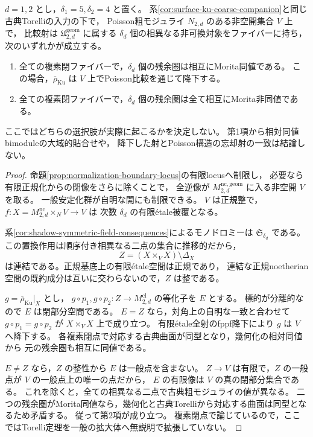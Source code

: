 \begin{proposition}[全同値または全て相互に非同値]
\label{prop:surface-ku-generic-dichotomy}
$d=1,2$ とし，$\delta_1=5,\delta_2=4$ と置く。
系\ref{cor:surface-ku-coarse-companion}と同じ古典Torelliの入力の下で，
Poisson粗モジュライ $N_{2,d}$ のある非空開集合 $V$ 上で，
比較射は $\mathfrak U^{\mathrm{geom}}_{2,d}$ に属する
$\delta_d$ 個の相異なる非可換対象をファイバーに持ち，次のいずれかが成立する。
\begin{enumerate}
 \item 全ての複素閉ファイバーで，$\delta_d$ 個の残余圏は相互にMorita同値である。
       この場合，$\overline\rho_{\mathrm{Ku}}$ は $V$ 上でPoisson比較を通じて降下する。
 \item 全ての複素閉ファイバーで，$\delta_d$ 個の残余圏は全て相互にMorita非同値である。
\end{enumerate}
ここではどちらの選択肢が実際に起こるかを決定しない。
第1項から相対同値bimoduleの大域的貼合せや，
降下した射とPoisson構造の忘却射の一致は結論しない。
\end{proposition}
\begin{proof}
命題\ref{prop:normalization-boundary-locus}の有限locusへ制限し，
必要なら有限正規化からの閉像をさらに除くことで，
全逆像が $M^{\mathrm{nc,geom}}_{2,d}$ に入る非空開 $V$ を取る。
一般安定化群が自明な開にも制限できる。
$V$ は正規整で，$f:X=M^{\mathrm{nc}}_{2,d}\times_N V\to V$ は
次数 $\delta_d$ の有限\'{e}tale被覆となる。

系\ref{cor:shadow-symmetric-field-consequences}によるモノドロミーは
$\mathfrak S_{\delta_d}$ である。
この置換作用は順序付き相異なる二点の集合に推移的だから，
\[
 Z=(X\times_V X)\setminus\Delta_X
\]
は連結である。正規基底上の有限\'{e}tale空間は正規であり，
連結な正規noetherian空間の既約成分は互いに交わらないので，$Z$ は整である。

$g=\overline\rho_{\mathrm{Ku}}|_X$ とし，
$g\circ p_1,g\circ p_2:Z\to M^{\mathrm{cl}}_{2,d}$ の等化子を $E$ とする。
標的が分離的なので $E$ は閉部分空間である。
$E=Z$ なら，対角上の自明な一致と合わせて
$g\circ p_1=g\circ p_2$ が $X\times_VX$ 上で成り立つ。
有限\'{e}tale全射のfppf降下により $g$ は $V$ へ降下する。
各複素閉点で対応する古典曲面が同型となり，幾何化の相対同値から
元の残余圏も相互に同値である。

$E\ne Z$ なら，$Z$ の整性から $E$ は一般点を含まない。
$Z\to V$ は有限で，$Z$ の一般点が $V$ の一般点上の唯一の点だから，
$E$ の有限像は $V$ の真の閉部分集合である。
これを除くと，全ての相異なる二点で古典粗モジュライの値が異なる。
二つの残余圏がMorita同値なら，幾何化と古典Torelliから対応する曲面は同型となるため矛盾する。
従って第2項が成り立つ。
複素閉点で論じているので，ここではTorelli定理を一般の拡大体へ無説明で拡張していない。
\end{proof}

